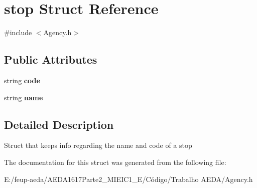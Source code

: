 \hypertarget{structstop}{}\section{stop Struct Reference}
\label{structstop}


{\ttfamily \#include $<$Agency.\+h$>$}

\subsection*{Public Attributes}
\begin{DoxyCompactItemize}
\item 
string {\bfseries code}
\item 
string {\bfseries name}
\end{DoxyCompactItemize}


\subsection{Detailed Description}
Struct that keeps info regarding the name and code of a stop 

The documentation for this struct was generated from the following file\+:\begin{DoxyCompactItemize}
\item 
E\+:/feup-\/aeda/\+A\+E\+D\+A1617\+Parte2\+\_\+M\+I\+E\+I\+C1\+\_\+\+E/\+Código/\+Trabalho A\+E\+D\+A/Agency.\+h\end{DoxyCompactItemize}
